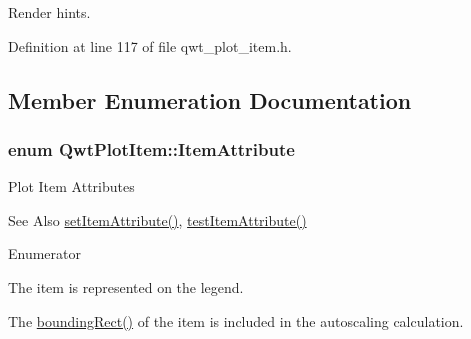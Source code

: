 Render hints. 



Definition at line 117 of file qwt\-\_\-plot\-\_\-item.\-h.



\subsection{Member Enumeration Documentation}
\hypertarget{class_qwt_plot_item_ae0fabcdd35f4818ce5bbe019b0eed062}{
\subsubsection[{Item\-Attribute}]{\setlength{\rightskip}{0pt plus 5cm}enum {\bf Qwt\-Plot\-Item\-::\-Item\-Attribute}}}\label{class_qwt_plot_item_ae0fabcdd35f4818ce5bbe019b0eed062}
Plot Item Attributes \begin{DoxySeeAlso}{See Also}
\hyperlink{class_qwt_plot_item_a5a335be8ff488809a2cf7f4b734ad1b6}{set\-Item\-Attribute()}, \hyperlink{class_qwt_plot_item_aef70936d34ef661876692e6a06d4a464}{test\-Item\-Attribute()} 
\end{DoxySeeAlso}
\begin{Desc}
\item[Enumerator]\par
\begin{description}
\item[{\em 
\hypertarget{class_qwt_plot_item_ae0fabcdd35f4818ce5bbe019b0eed062a4e377b54bd879c60a95162b6a9e9e176}{Legend}\label{class_qwt_plot_item_ae0fabcdd35f4818ce5bbe019b0eed062a4e377b54bd879c60a95162b6a9e9e176}
}]The item is represented on the legend. \item[{\em 
\hypertarget{class_qwt_plot_item_ae0fabcdd35f4818ce5bbe019b0eed062a9de83e2ad8a88796a36a11ef8b033a48}{Auto\-Scale}\label{class_qwt_plot_item_ae0fabcdd35f4818ce5bbe019b0eed062a9de83e2ad8a88796a36a11ef8b033a48}
}]The \hyperlink{class_qwt_plot_item_aec3c408e14af30b82b52c1197310eb21}{bounding\-Rect()} of the item is included in the autoscaling calculation. \end{description}
\end{Desc}


